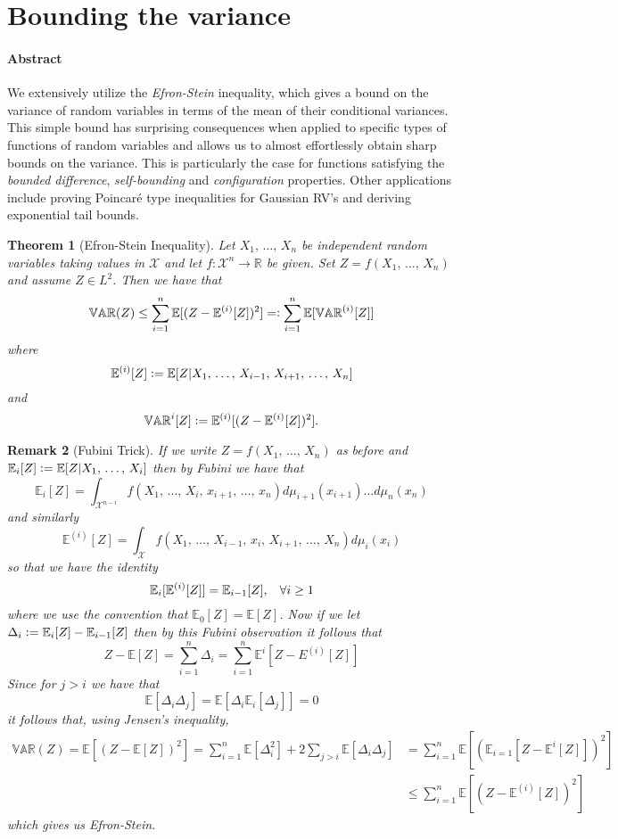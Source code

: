 \documentclass{amsproc}
\newtheorem{theorem}{Theorem}
\newtheorem{remark}[theorem]{Remark}
\newcommand{\defeq}{\vcentcolon=} %
\newcommand{\eqdef}{=\vcentcolon} %
\newcommand{\R}{\mathbb{R}}
\newcommand{\E}{\mathbb{E}} %
\newcommand{\var}{\mathbb{VAR}} %
\begin{document}

\section{Bounding the variance}
\label{sec:bound_var}
\paragraph{\textbf{Abstract}}
We extensively utilize the \textit{Efron-Stein} inequality, which gives a bound on the variance of random variables in terms of the mean of their conditional variances. This simple bound has surprising consequences when applied to specific types of functions of random variables and allows us to almost effortlessly obtain sharp bounds on the variance. This is particularly the case for functions satisfying the \textit{bounded difference}, \emph{self-bounding} and \emph{configuration} properties. Other applications include proving Poincar\'{e} type inequalities for Gaussian RV's and deriving exponential tail bounds.

\begin{theorem}[Efron-Stein Inequality]
\label{thm:ESI}
	Let $X_1,\,\dots,\,X_n$ be independent random variables taking values in $\mathcal{X}$ and let $f: \mathcal{X}^n \to \R$ be given.
	Set $Z = f(X_1,\,\dots,\,X_n)$ and assume $Z \in L^2$. Then we have that 
	$$\var(Z)\leq \sum\limits_{i=1}^n \E[(Z-\E^{(i)}[Z])^2] \eqdef \sum\limits_{i=1}^n \E[\var^{(i)}[Z]]$$ where 
	$$\E^{(i)}[Z] \defeq \E[Z|X_1,\,\dots,\,X_{i-1},\,X_{i+1},\,\dots,\,X_n]$$ and $$\var^{i}[Z] \defeq \E^{(i)}[(Z - \E^{(i)}[Z])^2].$$ 
\end{theorem}

\begin{remark}[Fubini Trick]
\label{rmk:Fubini}
	If we write $Z = f(X_1,\,\dots,\,X_n)$ as before and 
	$\E_i[Z] \defeq \E[Z|X_1,\,\dots,\,X_i]$ then by Fubini we have that 
	$$\E_i[Z] = \int_{\mathcal{X}^{n-i}} f(X_1,\,\dots,\,X_i,\,x_{i+1},\,\dots,\,x_{n})d\mu_{i+1}(x_{i+1})\dots d\mu_n(x_{n})$$ and similarly
	$$\E^{(i)}[Z] = \int_\mathcal{X} f(X_1,\,\dots,\,X_{i-1},\,x_i,\,X_{i+1},\,\dots,\,X_n)d\mu_i(x_i)$$ so that we have the identity
	$$\E_i[\E^{(i)}[Z]] = \E_{i-1}[Z], \hspace{0.3 cm} \forall i \geq 1$$
	where we use the convention that $\E_0[Z] = \E[Z]$. Now if we let $\Delta_i \defeq \E_i[Z] - \E_{i-1}[Z]$ then by this Fubini observation it follows that 
	$$Z - \E[Z] = \sum\limits_{i=1}^n \Delta_i = \sum\limits_{i=1}^n \E^i[Z - E^{(i)}[Z]]$$ 
	Since for $j > i$ we have that
	$$\E[\Delta_i\Delta_j] = \E[\Delta_i\E_i[\Delta_j]] = 0$$ it follows that, using Jensen's inequality,
	\begin{align*}
		\var(Z)
		= \E[(Z-\E[Z])^2]
		= \sum\limits_{i=1}^n \E[\Delta_i^2] + 2\sum\limits_{j>i}\E[\Delta_i\Delta_j]
		&= \sum\limits_{i=1}^n \E[(\E_{i=1}[Z - \E^{i}[Z]])^2]\\
		&\leq\sum\limits_{i=1}^n \E[(Z - \E^{(i)}[Z])^2]
	\end{align*}
	which gives us Efron-Stein.  
\end{remark}
\end{document}
